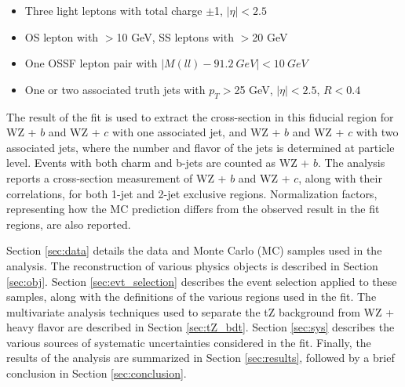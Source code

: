 \begin{itemize}
\item Three light leptons with total charge $\pm$1, $|\eta| < 2.5$
\item OS lepton with \pt$>$10 GeV, SS leptons with \pt$>$20 GeV
\item One OSSF lepton pair with $|M(ll)-91.2\ GeV| < 10\ GeV$
\item One or two associated truth jets with $p_T >$25 GeV, $|\eta| < 2.5$, $R<0.4$
\end{itemize}

The result of the fit is used to extract the cross-section in this fiducial region for WZ + $b$ and WZ + $c$ with one associated jet, and WZ + $b$ and WZ + $c$ with two associated jets, where the number and flavor of the jets is determined at particle level. Events with both charm and b-jets are counted as WZ + $b$. The analysis reports a cross-section measurement of WZ + $b$ and WZ + $c$, along with their correlations, for both 1-jet and 2-jet exclusive regions. Normalization factors, representing how the MC prediction differs from the observed result in the fit regions, are also reported.

Section \ref{sec:data} details the data and Monte Carlo (MC) samples used in the analysis. The reconstruction of various physics objects is described in Section \ref{sec:obj}. Section \ref{sec:evt_selection} describes the event selection applied to these samples, along with the definitions of the various regions used in the fit. The multivariate analysis techniques used to separate the tZ background from WZ + heavy flavor are described in Section \ref{sec:tZ_bdt}. Section \ref{sec:sys} describes the various sources of systematic uncertainties considered in the fit. Finally, the results of the analysis are summarized in Section \ref{sec:results}, followed by a brief conclusion in Section \ref{sec:conclusion}.


